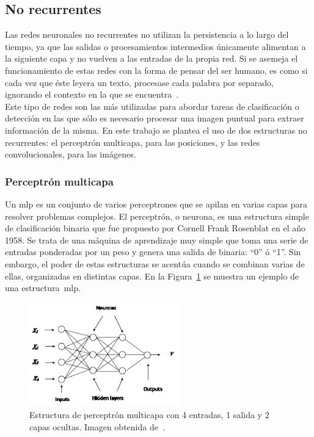 \subsection{No recurrentes}
Las redes neuronales no recurrentes no utilizan la persistencia a lo largo del tiempo, ya que las salidas o procesamientos intermedios únicamente alimentan a la siguiente capa y no vuelven a las entradas de la propia red. Si se asemeja el funcionamiento de estas redes con la forma de pensar del ser humano, es como si cada vez que éste leyera un texto, procesase cada palabra por separado, ignorando el contexto en la que se encuentra~\cite{lstm}.\\

Este tipo de redes son las más utilizadas para abordar tareas de clasificación o detección en las que sólo es necesario procesar una imagen puntual para  extraer información de la misma. En este trabajo se plantea el uso de dos estructuras no recurrentes: el perceptrón multicapa, para las posiciones, y las redes convolucionales, para las imágenes. 

\subsubsection{Perceptrón multicapa} \label{ap.mlp}
Un \acrfull{mlp}\cite{mlp} es un conjunto de varios perceptrones que se apilan en varias capas para resolver problemas complejos. El perceptrón, o neurona, es una estructura simple  de clasificación binaria que fue propuesto por Cornell Frank Rosenblat en el año 1958. Se trata de una máquina de aprendizaje muy simple que toma una serie de entradas ponderadas por un peso y genera una salida de binaria: ``0'' ó ``1''. Sin embargo, el poder de estas estructuras se acentúa cuando se combinan varias de ellas, organizadas en distintas capas. En la Figura~\ref{fig.mlp} se muestra un ejemplo de una estructura~\acrshort{mlp}.
\vspace{5pt}
\begin{figure}[H]
	\begin{center}
		\includegraphics[width=0.58\textwidth]{ figures/intro/mlp.png}
		\caption{Estructura de perceptrón multicapa con 4 entradas, 1 salida y 2 capas ocultas. Imagen obtenida de~\cite{mlpstruct}.}
		\label{fig.mlp}
	\end{center}
\end{figure}
\vspace{-10pt}

